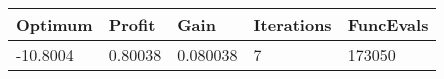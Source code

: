 \begin{tabular}{lllll}
Optimum & Profit & Gain & Iterations & FuncEvals \\ 
\hline 
-10.8004 & 0.80038 & 0.080038 & 7 & 173050 \\ 
\hline 
\end{tabular}